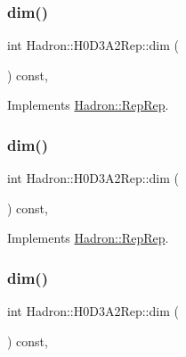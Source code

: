 \subsubsection{\texorpdfstring{dim()}{dim()}\hspace{0.1cm}{\footnotesize\ttfamily [3/5]}}
{\footnotesize\ttfamily int Hadron\+::\+H0\+D3\+A2\+Rep\+::dim (\begin{DoxyParamCaption}{ }\end{DoxyParamCaption}) const\hspace{0.3cm}{\ttfamily [inline]}, {\ttfamily [virtual]}}



Implements \mbox{\hyperlink{structHadron_1_1RepRep_a92c8802e5ed7afd7da43ccfd5b7cd92b}{Hadron\+::\+Rep\+Rep}}.

\mbox{\label{structHadron_1_1H0D3A2Rep_ac1e8bf30c08358a2d9c24c5cf8c767a7}} 
\subsubsection{\texorpdfstring{dim()}{dim()}\hspace{0.1cm}{\footnotesize\ttfamily [4/5]}}
{\footnotesize\ttfamily int Hadron\+::\+H0\+D3\+A2\+Rep\+::dim (\begin{DoxyParamCaption}{ }\end{DoxyParamCaption}) const\hspace{0.3cm}{\ttfamily [inline]}, {\ttfamily [virtual]}}



Implements \mbox{\hyperlink{structHadron_1_1RepRep_a92c8802e5ed7afd7da43ccfd5b7cd92b}{Hadron\+::\+Rep\+Rep}}.

\mbox{\label{structHadron_1_1H0D3A2Rep_ac1e8bf30c08358a2d9c24c5cf8c767a7}} 
\subsubsection{\texorpdfstring{dim()}{dim()}\hspace{0.1cm}{\footnotesize\ttfamily [5/5]}}
{\footnotesize\ttfamily int Hadron\+::\+H0\+D3\+A2\+Rep\+::dim (\begin{DoxyParamCaption}{ }\end{DoxyParamCaption}) const\hspace{0.3cm}{\ttfamily [inline]}, {\ttfamily [virtual]}}




